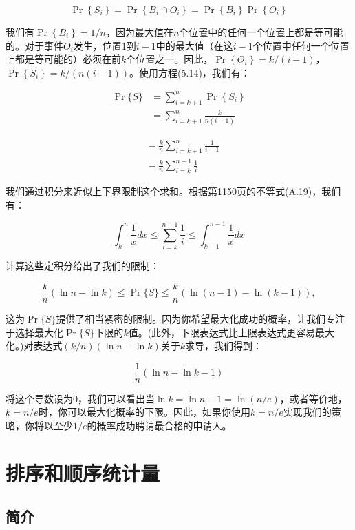 \documentclass[lang=cn,newtx,10pt,scheme=chinese]{elegantbook}
\begin{document}
$$
\operatorname{Pr}\left\{S_i\right\}=\operatorname{Pr}\left\{B_i \cap O_i\right\}=\operatorname{Pr}\left\{B_i\right\} \operatorname{Pr}\left\{O_i\right\}
$$

我们有$\operatorname{Pr}\left\{B_i\right\}=1 / n$，因为最大值在$n$个位置中的任何一个位置上都是等可能的。对于事件$O_i$发生，位置1到$i-1$中的最大值（在这$i-1$个位置中任何一个位置上都是等可能的）必须在前$k$个位置之一。因此，$\operatorname{Pr}\left\{O_i\right\}=k /(i-1)$，$\operatorname{Pr}\left\{S_i\right\}=k /(n(i-1))$。使用方程(5.14)，我们有：

$$
\begin{aligned}
\operatorname{Pr}\{S\} & =\sum_{i=k+1}^n \operatorname{Pr}\left\{S_i\right\} \\
& =\sum_{i=k+1}^n \frac{k}{n(i-1)}
\end{aligned}
$$

$$
\begin{aligned}
& =\frac{k}{n} \sum_{i=k+1}^n \frac{1}{i-1} \\
& =\frac{k}{n} \sum_{i=k}^{n-1} \frac{1}{i}
\end{aligned}
$$

我们通过积分来近似上下界限制这个求和。根据第1150页的不等式(A.19)，我们有：

$$
\int_k^n \frac{1}{x} d x \leq \sum_{i=k}^{n-1} \frac{1}{i} \leq \int_{k-1}^{n-1} \frac{1}{x} d x
$$

计算这些定积分给出了我们的限制：

$$
\frac{k}{n}(\ln n-\ln k) \leq \operatorname{Pr}\{S\} \leq \frac{k}{n}(\ln (n-1)-\ln (k-1)),
$$

这为$\operatorname{Pr}\{S\}$提供了相当紧密的限制。因为你希望最大化成功的概率，让我们专注于选择最大化$\operatorname{Pr}\{S\}$下限的$k$值。(此外，下限表达式比上限表达式更容易最大化。)对表达式$(k / n)(\ln n-\ln k)$关于$k$求导，我们得到：

$$
\frac{1}{n}(\ln n-\ln k-1)
$$

将这个导数设为0，我们可以看出当$\ln k=\ln n-1=\ln (n / e)$，或者等价地，$k=n / e$时，你可以最大化概率的下限。因此，如果你使用$k=n / e$实现我们的策略，你将以至少$1 / e$的概率成功聘请最合格的申请人。

\part{排序和顺序统计量}

\chapter*{简介}
\end{document}
